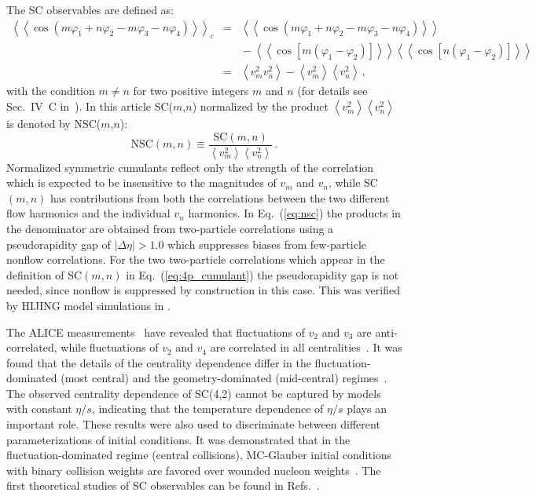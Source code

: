 The SC observables are defined as:
\begin{eqnarray}
\left<\left<\cos(m\varphi_1\!+\!n\varphi_2\!-\!m\varphi_3-\!n\varphi_4)\right>\right>_c &=& \left<\left<\cos(m\varphi_1\!+\!n\varphi_2\!-\!m\varphi_3-\!n\varphi_4)\right>\right>\nonumber\\
&&{}-\left<\left<\cos[m(\varphi_1\!-\!\varphi_2)]\right>\right>\left<\left<\cos[n(\varphi_1\!-\!\varphi_2)]\right>\right>\nonumber\\
&=&\left<v_{m}^2v_{n}^2\right>-\left<v_{m}^2\right>\left<v_{n}^2\right>\,,%
\label{eq:4p_cumulant}
\end{eqnarray}
%
with the condition $m\neq n$ for two positive integers $m$ and $n$ (for details see Sec.~IV~C in~\cite{Bilandzic:2013kga}).
In this article SC($m$,$n$) normalized by the product $\left<v_{m}^2\right>\left<v_{n}^2\right>$~\cite{ALICE:2016kpq,Giacalone:2016afq} is denoted by NSC($m$,$n$):
%
\begin{equation}
\mathrm{NSC}(m,n) \equiv \frac{\mathrm{SC}(m,n)}{\left<v_{m}^2\right>\left<v_{n}^2\right>}\,.
\label{eq:nsc}
\end{equation}
%
Normalized symmetric cumulants reflect only the strength of the correlation which is expected to be insensitive to the magnitudes of $v_{m}$ and $v_{n}$, while SC$(m,n)$ has contributions from both the correlations between the two different flow harmonics and the individual $v_{n}$ harmonics. In Eq.~(\ref{eq:nsc}) the products in the denominator are obtained from two-particle correlations using a pseudorapidity gap of $|\Delta\eta|>1.0$ which suppresses biases from few-particle nonflow correlations. For the two two-particle correlations which appear in the definition of SC$(m,n)$ in Eq.~(\ref{eq:4p_cumulant}) the pseudorapidity gap is not needed, since nonflow is suppressed by construction in this case. This was verified by HIJING model simulations in \cite{ALICE:2016kpq}.

The ALICE measurements~\cite{ALICE:2016kpq} have revealed that fluctuations of $v_2$ and $v_3$ are anti-correlated, while fluctuations of $v_2$ and $v_4$ are correlated in all centralities~\cite{ALICE:2016kpq}. It was found that the details of the centrality dependence differ in the fluctuation-dominated (most central) and the geometry-dominated (mid-central) regimes~\cite{ALICE:2016kpq}. The observed centrality dependence of SC(4,2) cannot be captured by models with constant $\eta/s$, indicating that the temperature dependence of $\eta/s$ plays an important role. These results were also used to discriminate between different parameterizations of initial conditions. It was demonstrated that in the fluctuation-dominated regime (central collisions), MC-Glauber initial conditions with binary collision weights are favored over wounded nucleon weights~\cite{ALICE:2016kpq}. 
The first theoretical studies of SC observables can be found in Refs.~\cite{Giacalone:2016afq,Qian:2016pau,Gardim:2016nrr,Zhu:2016puf,Ke:2016jrd}.

